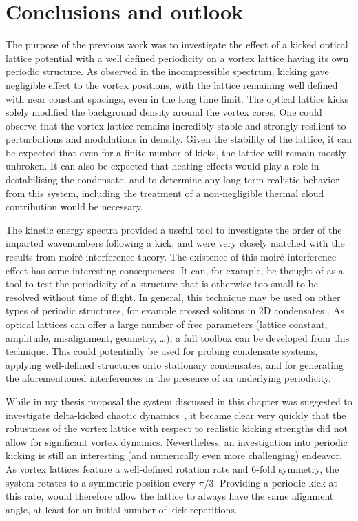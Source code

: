 \section{Conclusions and outlook}\label{sec:ch5_conc}
The purpose of the previous work was to investigate the effect of a kicked optical lattice potential with a well defined periodicity on a vortex lattice having its own periodic structure. As observed in the incompressible spectrum, kicking gave negligible effect to the vortex positions, with the lattice remaining well defined with near constant spacings, even in the long time limit. The optical lattice kicks solely modified the background density around the vortex cores. One could observe that the vortex lattice remains incredibly stable and strongly resilient to perturbations and modulations in density. Given the stability of the lattice, it can be expected that even for a finite number of kicks, the lattice will remain mostly unbroken. It can also be expected that heating effects would play a role in destabilising the condensate, and to determine any long-term realistic behavior from this system, including the treatment of a non-negligible thermal cloud contribution would be necessary.

The kinetic energy spectra provided a useful tool to investigate the order of the imparted wavenumbers following a kick, and were very closely matched with the results from moir\'e interference theory. The existence of this moir\'e interference effect has some interesting consequences. It can, for example, be thought of as a tool to test the periodicity of a structure that is otherwise too small to be resolved without time of flight. In general, this technique may be used on other types of periodic structures, for example crossed solitons in 2D condensates \cite{BEC:Morgan_soliton_2013}. As optical lattices can offer a large number of free parameters (lattice constant, amplitude, misalignment, geometry, \ldots), a full toolbox can be developed from this technique. This could potentially be used for probing condensate systems, applying well-defined structures onto stationary condensates, and for generating the aforementioned interferences in the presence of an underlying periodicity.


While in my thesis proposal the system discussed in this chapter was suggested to investigate delta-kicked chaotic dynamics~\cite{CT:Gardiner_pra_2000}, it became clear very quickly that the robustness of the vortex lattice with respect to realistic kicking strengths did not allow for significant vortex dynamics. Nevertheless, an investigation into periodic kicking is still an interesting (and numerically even more challenging) endeavor. As vortex lattices feature a well-defined rotation rate and 6-fold symmetry, the system rotates to a symmetric position every $\pi/3$. Providing a periodic kick at this rate, would therefore allow the lattice to always have the same alignment angle, at least for an initial number of kick repetitions.
